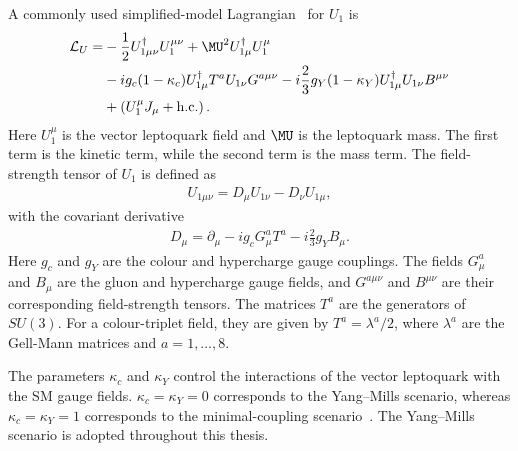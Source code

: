 A commonly used simplified-model Lagrangian~\cite{Cornella2019} for $U_{1}$ is
\begin{align}
    \mathcal{L}_{U}
    =
    &
    -\frac{1}{2}
    U_{1\mu\nu}^{\dagger}
    U_{1}^{\mu\nu}
    +
    \MU^{2}
    U_{1\mu}^{\dagger}
    U_{1}^{\mu}
    \nonumber\\
    &
    -ig_{c}(1-\kappa_{c})
    U_{1\mu}^{\dagger}
    T^{a}
    U_{1\nu}
    G^{a\mu\nu}
    -
    i\frac{2}{3}g_{Y}(1-\kappa_{Y})
    U_{1\mu}^{\dagger}
    U_{1\nu}
    B^{\mu\nu}
    \nonumber\\
    &
    +
    \left(
        U_{1}^{\mu}J_{\mu}
        +
        \mathrm{h.c.}
    \right).
    \label{eq:u1_full_lagrangian}
\end{align}
Here $U_{1}^{\mu}$ is the vector leptoquark field and $\MU$ is the leptoquark mass. 
The first term is the kinetic term, while the second term is the mass term. 
The field-strength tensor of $U_{1}$ is defined as
\begin{align}
    U_{1\mu\nu}
    =
    D_{\mu}U_{1\nu}
    -
    D_{\nu}U_{1\mu},
    \label{eq:u1_field_strength}
\end{align}
with the covariant derivative
\begin{align}
    D_{\mu}
    =
    \partial_{\mu}
    -
    ig_{c}G_{\mu}^{a}T^{a}
    -
    i\frac{2}{3}g_{Y}B_{\mu}.
    \label{eq:u1_covariant_derivative}
\end{align}
Here $g_{c}$ and $g_{Y}$ are the colour and hypercharge gauge couplings. 
The fields $G_{\mu}^{a}$ and $B_{\mu}$ are the gluon and hypercharge gauge fields, and $G^{a\mu\nu}$ and $B^{\mu\nu}$ are their corresponding field-strength tensors. 
The matrices $T^{a}$ are the generators of $SU(3)$. 
For a colour-triplet field, they are given by $T^{a}=\lambda^{a}/2$, where $\lambda^{a}$ are the Gell-Mann matrices and $a=1,\ldots,8$.

The parameters $\kappa_{c}$ and $\kappa_{Y}$ control the interactions
of the vector leptoquark with the SM gauge fields.
$\kappa_{c}=\kappa_{Y}=0$ corresponds to the Yang--Mills scenario,
whereas $\kappa_{c}=\kappa_{Y}=1$ corresponds to the minimal-coupling
scenario~\cite{Baker2019HighPTU1}.
The Yang--Mills scenario is adopted throughout this thesis.

